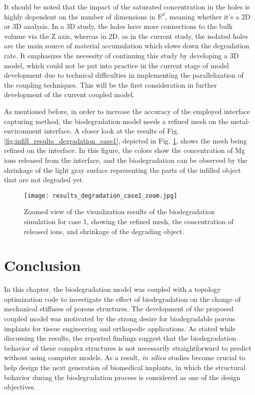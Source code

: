 It should be noted that the impact of the saturated concentration in the holes is highly dependent on the number of dimensions in $\mathbb{R}^d$, meaning whether it's a 2D or 3D analysis. In a 3D study, the holes have more connections to the bulk volume via the Z axis, whereas in 2D, as in the current study, the isolated holes are the main source of material accumulation which slows down the degradation rate. It emphasizes the necessity of continuing this study by developing a 3D model, which could not be put into practice in the current stage of model development due to technical difficulties in implementing the parallelization of the coupling techniques. This will be the first consideration in further development of the current coupled model.

As mentioned before, in order to increase the accuracy of the employed interface capturing method, the biodegradation model needs a refined mesh on the metal-environment interface. A closer look at the results of Fig. \ref{fig:infill_results_degradation_case1}, depicted in Fig. \ref{fig:infill_results_degradation_case1_zoom}, shows the mesh being refined on the interface. In this figure, the colors show the concentration of Mg ions released from the interface, and the biodegradation can be observed by the shrinkage of the light gray surface representing the parts of the infilled object that are not degraded yet.


\begin{figure}[h]
\centering
\medskip
\texttt{[image: results\_degradation\_case1\_zoom.jpg]}
\caption[Zoom view of the results of the biodegradation simulation for case 1]{Zoomed view of the visualization results of the biodegradation simulation for case 1, showing the refined mesh, the concentration of released ions, and shrinkage of the degrading object.} \label{fig:infill_results_degradation_case1_zoom}
\end{figure}

\section{Conclusion}

In this chapter, the biodegradation model was coupled with a topology optimization code to investigate the effect of biodegradation on the change of mechanical stiffness of porous structures. The development of the proposed coupled model was motivated by the strong desire for biodegradable porous implants for tissue engineering and orthopedic applications. As stated while discussing the results, the reported findings suggest that the biodegradation behavior of these complex structures is not necessarily straightforward to predict without using computer models. As a result, \textit{in silico} studies become crucial to help design the next generation of biomedical implants, in which the structural behavior during the biodegradation process is considered as one of the design objectives.

